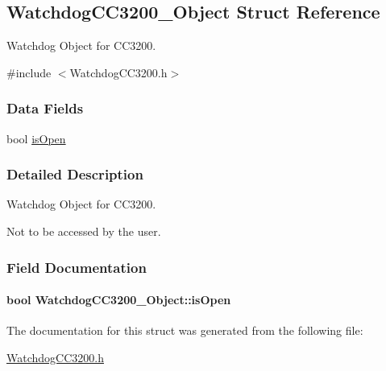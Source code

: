 \subsection{Watchdog\+C\+C3200\+\_\+\+Object Struct Reference}
\label{struct_watchdog_c_c3200___object}


Watchdog Object for C\+C3200.  




{\ttfamily \#include $<$Watchdog\+C\+C3200.\+h$>$}

\subsubsection*{Data Fields}
\begin{DoxyCompactItemize}
\item 
bool \hyperlink{struct_watchdog_c_c3200___object_a1fcac0aa0c5c81395da5ae4f0ae3d677}{is\+Open}
\end{DoxyCompactItemize}


\subsubsection{Detailed Description}
Watchdog Object for C\+C3200. 

Not to be accessed by the user. 

\subsubsection{Field Documentation}
\paragraph[{is\+Open}]{\setlength{\rightskip}{0pt plus 5cm}bool Watchdog\+C\+C3200\+\_\+\+Object\+::is\+Open}\label{struct_watchdog_c_c3200___object_a1fcac0aa0c5c81395da5ae4f0ae3d677}


The documentation for this struct was generated from the following file\+:\begin{DoxyCompactItemize}
\item 
\hyperlink{_watchdog_c_c3200_8h}{Watchdog\+C\+C3200.\+h}\end{DoxyCompactItemize}
